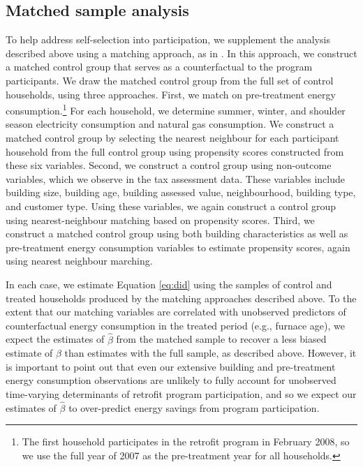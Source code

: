 \documentclass{article}
\begin{document}
\subsection{Matched sample analysis}\label{sec:match}

To help address self-selection into participation, we supplement the analysis described above using a matching approach, as in \cite{chuang2022residential}. In this approach, we construct a matched control group that serves as a counterfactual to the program participants. We draw the matched control group from the full set of control households, using three approaches.  First, we match on pre-treatment energy consumption.\footnote{The first household participates in the retrofit program in February 2008, so we use the full year of 2007 as the pre-treatment year for all households.} For each household, we determine summer, winter, and shoulder season electricity consumption and natural gas consumption. We construct a matched control group by selecting the nearest neighbour for each participant household from the full control group using propensity scores constructed from these six variables.  Second, we construct a control group using non-outcome variables, which we observe in the tax assessment data.  These variables include building size, building age, building assessed value, neighbourhood, building type, and customer type. Using these variables, we again construct a control group using nearest-neighbour matching based on propensity scores.  Third, we construct a matched control group using both building characteristics as well as pre-treatment energy consumption variables to estimate propensity scores, again using nearest neighbour marching.

In each case, we estimate Equation \eqref{eq:did} using the samples of control and treated households produced by the matching approaches described above. To the extent that our matching variables are correlated with unobserved predictors of counterfactual energy consumption in the treated period (e.g., furnace age), we expect the estimates of $\hat{\beta}$ from the matched sample to recover a less biased estimate of $\beta$ than estimates with the full sample, as described above. However, it is important to point out that even our extensive building and pre-treatment energy consumption observations are unlikely to fully account for unobserved time-varying determinants of retrofit program participation, and so we expect our estimates of $\hat{\beta}$ to over-predict energy savings from program participation.
\end{document}
